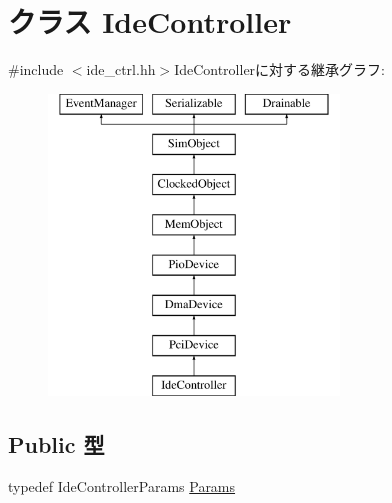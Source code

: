 \hypertarget{classIdeController}{
\section{クラス IdeController}
\label{classIdeController}
}


{\ttfamily \#include $<$ide\_\-ctrl.hh$>$}IdeControllerに対する継承グラフ:\begin{figure}[H]
\begin{center}
\leavevmode
\includegraphics[height=8cm]{classIdeController}
\end{center}
\end{figure}
\subsection*{Public 型}
\begin{DoxyCompactItemize}
\item 
typedef IdeControllerParams \hyperlink{classIdeController_ac3896424d9bf2d8a838f1e2c38870d02}{Params}
\end{DoxyCompactItemize}

